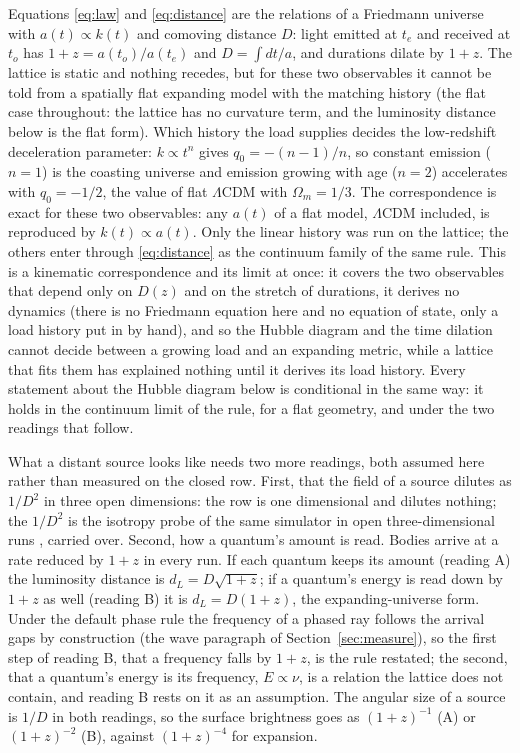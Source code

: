 \documentclass[11pt]{article}
\begin{document}
Equations \eqref{eq:law} and \eqref{eq:distance} are the relations of a
Friedmann universe with $a(t) \propto k(t)$ and comoving distance $D$: light
emitted at $t_e$ and received at $t_o$ has $1 + z = a(t_o)/a(t_e)$ and
$D = \int dt / a$, and durations dilate by $1 + z$. The lattice is static and
nothing recedes, but for these two observables it cannot be told from a
spatially flat expanding model with the matching history (the flat case
throughout: the lattice has no curvature term, and the luminosity distance
below is the flat form). Which history the load supplies decides
the low-redshift deceleration parameter: $k \propto t^n$ gives $q_0 = -(n-1)/n$,
so constant emission ($n = 1$) is the coasting universe and emission growing
with age ($n = 2$) accelerates with $q_0 = -1/2$, the value of flat
$\Lambda$CDM with $\Omega_m = 1/3$. The correspondence is exact for these two observables: any $a(t)$ of a
flat model, $\Lambda$CDM included, is reproduced by $k(t) \propto a(t)$. Only
the linear history was run on the lattice; the others enter through
\eqref{eq:distance} as the continuum family of the same rule. This is a
kinematic correspondence and its limit at once: it covers the two
observables that depend only on $D(z)$ and on the stretch of durations, it
derives no dynamics (there is no Friedmann equation here and no equation of
state, only a load history put in by hand), and so the Hubble diagram and
the time dilation cannot decide between a growing load and an expanding
metric, while a lattice that fits them has explained nothing until it
derives its load history. Every statement about the Hubble diagram below
is conditional in the same way: it holds in the continuum limit of the
rule, for a flat geometry, and under the two readings that follow.

What a distant source looks like needs two more readings, both assumed
here rather than measured on the closed row. First, that the field of a
source dilutes as $1/D^2$ in three open dimensions: the row is one
dimensional and dilutes nothing; the $1/D^2$ is the isotropy probe of the
same simulator in open three-dimensional runs \cite{zenodo}, carried over.
Second, how a quantum's amount is read. Bodies arrive at a rate reduced by
$1 + z$ in every run. If each quantum keeps its amount (reading A) the
luminosity distance is $d_L = D\sqrt{1+z}$; if a quantum's energy is read
down by $1 + z$ as well (reading B) it is $d_L = D(1+z)$, the
expanding-universe form. Under the default phase rule the frequency of a phased ray follows the
arrival gaps by construction (the wave paragraph of
Section~\ref{sec:measure}), so the first step of reading B, that a
frequency falls by $1 + z$, is the rule restated; the second, that a
quantum's energy is its frequency, $E \propto \nu$, is a relation the
lattice does not contain, and reading B rests on it as an assumption. The angular size of a source is $1/D$ in both
readings, so the surface brightness goes as $(1+z)^{-1}$ (A) or
$(1+z)^{-2}$ (B), against $(1+z)^{-4}$ for expansion.
\end{document}

